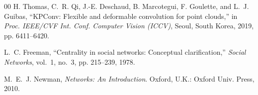 \documentclass[conference]{IEEEtran}
\begin{document}
\begin{thebibliography}{00}
 H. Thomas, C.~R. Qi, J.-E. Deschaud, B. Marcotegui, F. Goulette, and L.~J. Guibas, ``KPConv: Flexible and deformable convolution for point clouds,'' in \emph{Proc. IEEE/CVF Int. Conf. Computer Vision (ICCV)}, Seoul, South Korea, 2019, pp. 6411--6420.

 L.~C. Freeman, ``Centrality in social networks: Conceptual clarification,'' \emph{Social Networks}, vol.~1, no.~3, pp. 215--239, 1978.

 M.~E.~J. Newman, \emph{Networks: An Introduction}. Oxford, U.K.: Oxford Univ. Press, 2010.

\end{thebibliography}
\end{document}
